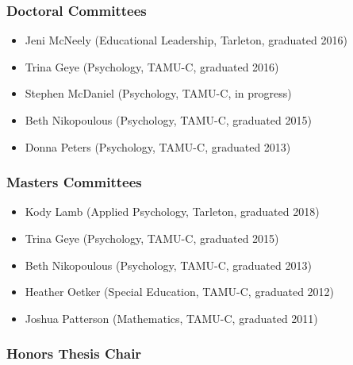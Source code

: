 \documentclass[article,10pt]{article}
\begin{document}
\subsubsection*{Doctoral Committees}
\label{sec:org5bde594}

\begin{itemize}
\item Jeni McNeely (Educational Leadership, Tarleton, graduated 2016)
\item Trina Geye (Psychology, TAMU-C, graduated 2016)
\item Stephen McDaniel (Psychology, TAMU-C, in progress)
\item Beth Nikopoulous (Psychology, TAMU-C, graduated 2015)
\item Donna Peters (Psychology, TAMU-C, graduated 2013)
\end{itemize}

\subsubsection*{Masters Committees}
\label{sec:org0c054fd}

\begin{itemize}
\item Kody Lamb (Applied Psychology, Tarleton, graduated 2018)
\item Trina Geye (Psychology, TAMU-C, graduated 2015)
\item Beth Nikopoulous (Psychology, TAMU-C, graduated 2013)
\item Heather Oetker (Special Education, TAMU-C, graduated 2012)
\item Joshua Patterson (Mathematics, TAMU-C, graduated 2011)
\end{itemize}

\subsubsection*{Honors Thesis Chair}
\label{sec:org392a573}
\end{document}
